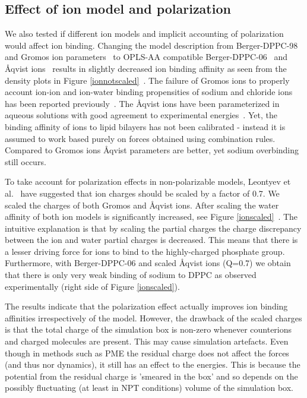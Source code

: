 \documentclass[pre,aps,floatfix,authordate1-4,twocolumn]{revtex4-1}
\begin{document}
\subsection{Effect of ion model and polarization}

 We also tested if different ion models and implicit accounting of polarization would affect ion binding.
 Changing the model description from Berger-DPPC-98~\cite{Marrink98} and Gromos ion
 parameters~\cite{??} to OPLS-AA compatible
 Berger-DPPC-06~\cite{tieleman06} and \r{A}qvist ions~\cite{Aaqvist90} results in slightly decreased ion binding affinity
 as seen from the density plots in Figure \ref{ionnotscaled}~\cite{DPPCBergerNaCl, DPPCBergerOPLS06NaCl}. The failure
 of Gromos ions to properly account ion-ion and ion-water binding propensities of sodium and chloride ions has been
 reported previously~\cite{Reif13}. The \r{A}qvist ions have been parameterized in aqueous solutions with good agreement
 to experimental energies~\cite{Aaqvist90}. Yet, the binding affinity of ions to lipid bilayers has not been
 calibrated - instead it is assumed to work based purely on forces obtained using combination rules. Compared to Gromos
 ions \r{A}qvist parameters are better, yet sodium overbinding still occurs.

To take account for polarization effects in non-polarizable models, Leontyev et al.~\cite{leontyev11} have suggested
that ion charges should be scaled by a factor of 0.7. We scaled the charges of both Gromos and \r{A}qvist ions. After
scaling the water affinity of both ion models is significantly increased, see
Figure \ref{ionscaled}~\cite{DPPCBergerNaClscaled, DPPCBergerOPLS06NaClscaled}. The intuitive explanation is that by
scaling the partial charges the charge discrepancy between the ion and water partial charges is decreased. This means
that there is a lesser driving force for ions to bind to the highly-charged phosphate group. Furthermore, with
Berger-DPPC-06 and scaled Åqvist ions (Q=0.7) we obtain that there is only very weak binding of sodium to DPPC as
observed experimentally (right side of Figure \ref{ionscaled}).

The results indicate that the polarization effect actually improves ion binding affinities irrespectively of the model.
However, the drawback of the scaled charges is that the total charge of the simulation box is non-zero whenever
counterions and charged molecules are present. This may cause simulation artefacts. Even though in methods such as
PME the residual charge does not affect the forces (and thus nor dynamics), it still has an effect to the energies.
This is because the potential from the residual charge is 'smeared in the box' and so depends on the possibly
fluctuating (at least in NPT conditions) volume of the simulation box. 
\end{document}
